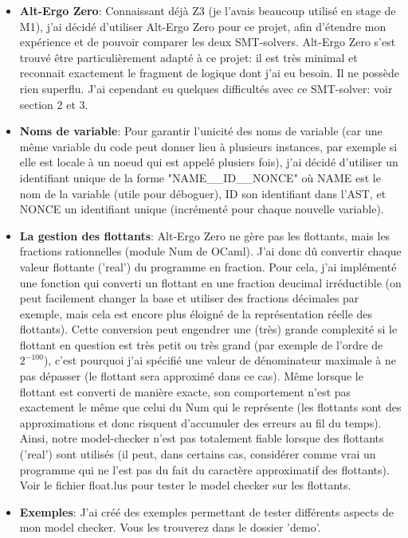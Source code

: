 \documentclass[a4paper]{article}%
\begin{document}
\begin{itemize}
		\item \textbf{Alt-Ergo Zero}: Connaissant déjà Z3 (je l'avais beaucoup utilisé en stage de M1), j'ai décidé d'utiliser Alt-Ergo Zero pour ce projet,
		afin d'étendre mon expérience et de pouvoir comparer les deux SMT-solvers. Alt-Ergo Zero s'est trouvé être particulièrement adapté à ce projet:
		il est très minimal et reconnait exactement le fragment de logique dont j'ai eu besoin. Il ne possède rien superflu.
		J'ai cependant eu quelques difficultés avec ce SMT-solver: voir section 2 et 3.\\
		\item \textbf{Noms de variable}: Pour garantir l'unicité des noms de variable (car une même variable du code peut donner lieu à plusieurs instances,
		par exemple si elle est locale à un noeud qui est appelé plusiers fois), j'ai décidé d'utiliser un identifiant unique de la forme "NAME\_\_ID\_\_NONCE"
		où NAME est le nom de la variable (utile pour déboguer), ID son identifiant dans l'AST, et NONCE un identifiant unique (incrémenté pour chaque nouvelle variable).\\
		\item \textbf{La gestion des flottants}: Alt-Ergo Zero ne gère pas les flottants, mais les fractions rationnelles (module Num de OCaml).
		J'ai donc dû convertir chaque valeur flottante ('real') du programme en fraction. Pour cela, j'ai implémenté une fonction qui converti un flottant en une fraction
		deucimal irréductible (on peut facilement changer la base et utiliser des fractions décimales par exemple, mais cela est encore plus éloigné de la représentation réelle des flottants).
		Cette conversion peut engendrer une (très) grande complexité si le flottant en question est très petit ou très grand (par exemple de l'ordre de $2^{-100}$),
		c'est pourquoi j'ai spécifié une valeur de dénominateur maximale à ne pas dépasser (le flottant sera approximé dans ce cas).
		Même lorsque le flottant est converti de manière exacte, son comportement n'est pas exactement le même que celui du Num qui le représente
		(les flottants sont des approximations et donc risquent d'accumuler des erreurs au fil du temps).
		Ainsi, notre model-checker n'est pas totalement fiable lorsque des flottants ('real') sont utilisés (il peut, dans certains cas, considérer comme vrai
		un programme qui ne l'est pas du fait du caractère approximatif des flottants). Voir le fichier float.lus pour tester le model checker sur les flottants.\\
		\item \textbf{Exemples}: J'ai créé des exemples permettant de tester différents aspects de mon model checker. Vous les trouverez dans le dossier 'demo'. 
	\end{itemize}\newpage
\end{document}
